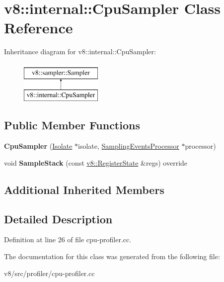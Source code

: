 \hypertarget{classv8_1_1internal_1_1CpuSampler}{}\section{v8\+:\+:internal\+:\+:Cpu\+Sampler Class Reference}
\label{classv8_1_1internal_1_1CpuSampler}
Inheritance diagram for v8\+:\+:internal\+:\+:Cpu\+Sampler\+:\begin{figure}[H]
\begin{center}
\leavevmode
\includegraphics[height=2.000000cm]{classv8_1_1internal_1_1CpuSampler}
\end{center}
\end{figure}
\subsection*{Public Member Functions}
\begin{DoxyCompactItemize}
\item 
\mbox{\label{classv8_1_1internal_1_1CpuSampler_adc418ffd4704c357936a2563d941d4ff}} 
{\bfseries Cpu\+Sampler} (\mbox{\hyperlink{classv8_1_1internal_1_1Isolate}{Isolate}} $\ast$isolate, \mbox{\hyperlink{classv8_1_1internal_1_1SamplingEventsProcessor}{Sampling\+Events\+Processor}} $\ast$processor)
\item 
\mbox{\label{classv8_1_1internal_1_1CpuSampler_adc6944a2d2a3ccf210c80dc36d16753a}} 
void {\bfseries Sample\+Stack} (const \mbox{\hyperlink{structv8_1_1RegisterState}{v8\+::\+Register\+State}} \&regs) override
\end{DoxyCompactItemize}
\subsection*{Additional Inherited Members}


\subsection{Detailed Description}


Definition at line 26 of file cpu-\/profiler.\+cc.



The documentation for this class was generated from the following file\+:\begin{DoxyCompactItemize}
\item 
v8/src/profiler/cpu-\/profiler.\+cc\end{DoxyCompactItemize}

